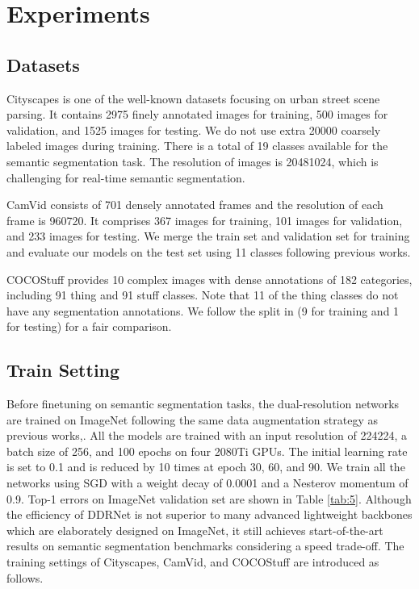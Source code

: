 \documentclass[journal]{IEEEtran}
\begin{document}
\section{Experiments}

\subsection{Datasets}

Cityscapes\cite{cordts2016cityscapes} is one of the well-known datasets focusing on urban street scene parsing. It contains 2975 finely annotated images for training, 500 images for validation, and 1525 images for testing. We do not use extra 20000 coarsely labeled images during training. There is a total of 19 classes available for the semantic segmentation task. The resolution of images is 20481024, which is challenging for real-time semantic segmentation.

CamVid\cite{brostow2009semantic} consists of 701 densely annotated frames and the resolution of each frame is 960720. It comprises 367 images for training, 101 images for validation, and 233 images for testing. We merge the train set and validation set for training and evaluate our models on the test set using 11 classes following previous works\cite{yu2018bisenet,orsic2019defense,li2019dfanet}.

COCOStuff\cite{caesar2018coco} provides 10 complex images with dense annotations of 182 categories, including 91 thing and 91 stuff classes. Note that 11 of the thing classes do not have any segmentation annotations. We follow the split in \cite{caesar2018coco} (9 for training and 1 for testing) for a fair comparison.


\subsection{Train Setting}

Before finetuning on semantic segmentation tasks, the dual-resolution networks are trained on ImageNet\cite{russakovsky2015imagenet} following the same data augmentation strategy as previous works\cite{he2016deep},\cite{xie2017aggregated}. All the models are trained with an input resolution of 224224, a batch size of 256, and 100 epochs on four 2080Ti GPUs. The initial learning rate is set to 0.1 and is reduced by 10 times at epoch 30, 60, and 90. We train all the networks using SGD with a weight decay of 0.0001 and a Nesterov momentum of 0.9. Top-1 errors on ImageNet validation set are shown in Table \ref{tab:5}. Although the efficiency of DDRNet is not superior to many advanced lightweight backbones which are elaborately designed on ImageNet, it still achieves start-of-the-art results on semantic segmentation benchmarks considering a speed trade-off. The training settings of Cityscapes, CamVid, and COCOStuff are introduced as follows.
\end{document}
